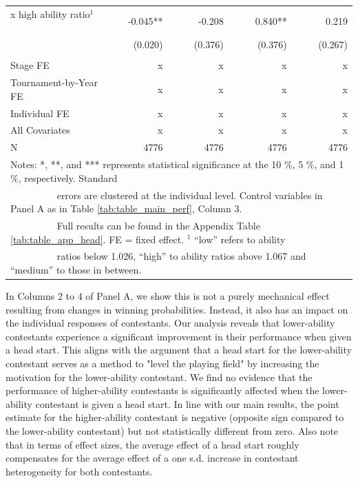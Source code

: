 \documentclass[11pt,a4paper]{article}
\begin{document}
\begin{table}[H]
\begin{tabular}{l r r r r r r r}
			x high ability ratio$^1$ ~~~         & -0.045**     & &  -0.208   & & 0.840**    & & 0.219   \\
			                                 & (0.020)      & & (0.376)   & & (0.376)    & & (0.267) \\
            \rule{0pt}{0.3ex}\\
            \midrule
			Stage FE  & x  & & x & & x & & x  \\ 
			Tournament-by-Year FE    & x  & & x & & x & & x  \\ 
			Individual FE            & x  & & x & & x & & x  \\ 
			All Covariates           & x  & & x & & x & & x  \\
            \midrule
            N                        & 4776 & & 4776 & & 4776 && 4776  \\ 		 
			\bottomrule
            \bottomrule
			\multicolumn{8}{l}{\footnotesize Notes: *, **, and *** represents statistical significance at the 10 \%, 5 \%, and 1 \%, respectively. Standard}\\
			\multicolumn{8}{l}{\footnotesize ~~~~~~~~~  errors are clustered at the individual level. Control variables in Panel A  as in Table \ref{tab:table_main_perf}, Column 3.}\\
			\multicolumn{8}{l}{\footnotesize ~~~~~~~~~     Full results can be found in the Appendix Table \ref{tab:table_app_head}. FE = fixed effect. $^1$ “low” refers to ability}\\
            \multicolumn{8}{l}{\footnotesize ~~~~~~~~~  ratios below 1.026, “high” to ability ratios above 1.067 and “medium” to those in between.}
   
		\end{tabular}
	\end{table}

In Columns 2 to 4 of Panel A, we show this is not a purely mechanical effect resulting from changes in winning probabilities. Instead, it also has an impact on the individual responses of contestants. Our analysis reveals that lower-ability contestants experience a significant improvement in their performance when given a head start. This aligns with the argument that a head start for the lower-ability contestant serves as a method to "level the playing field" by increasing the motivation for the lower-ability contestant. We find no evidence that the performance of higher-ability contestants is significantly affected when the lower-ability contestant is given a head start. In line with our main results, the point estimate for the higher-ability contestant is negative (opposite sign compared to the lower-ability contestant) but not statistically different from zero. Also note that in terms of effect sizes, the average effect of a head start roughly compensates for the average effect of a one s.d. increase in contestant heterogeneity for both contestants.\par
\end{document}
